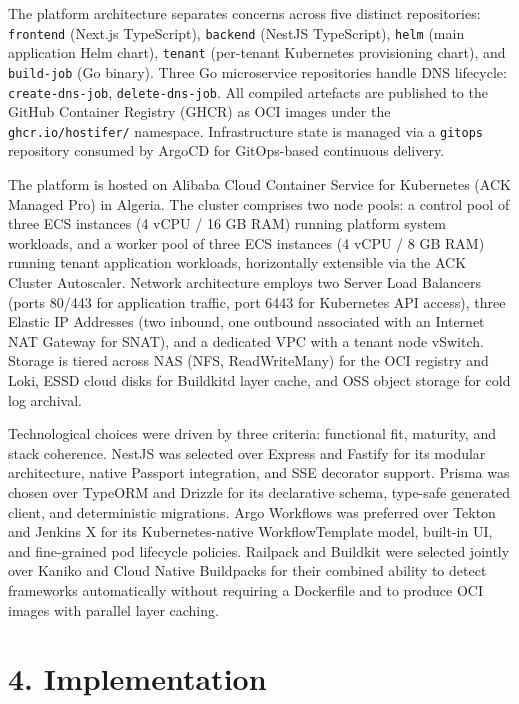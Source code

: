 The platform architecture separates concerns across five distinct repositories: \texttt{frontend} (Next.js TypeScript), \texttt{backend} (NestJS TypeScript), \texttt{helm} (main application Helm chart), \texttt{tenant} (per-tenant Kubernetes provisioning chart), and \texttt{build-job} (Go binary). Three Go microservice repositories handle DNS lifecycle: \texttt{create-dns-job}, \texttt{delete-dns-job}. All compiled artefacts are published to the GitHub Container Registry (GHCR) as OCI images under the \texttt{ghcr.io/hostifer/} namespace. Infrastructure state is managed via a \texttt{gitops} repository consumed by ArgoCD for GitOps-based continuous delivery.

The platform is hosted on Alibaba Cloud Container Service for Kubernetes (ACK Managed Pro) in Algeria. The cluster comprises two node pools: a control pool of three ECS instances (4 vCPU / 16 GB RAM) running platform system workloads, and a worker pool of three ECS instances (4 vCPU / 8 GB RAM) running tenant application workloads, horizontally extensible via the ACK Cluster Autoscaler. Network architecture employs two Server Load Balancers (ports 80/443 for application traffic, port 6443 for Kubernetes API access), three Elastic IP Addresses (two inbound, one outbound associated with an Internet NAT Gateway for SNAT), and a dedicated VPC with a tenant node vSwitch. Storage is tiered across NAS (NFS, ReadWriteMany) for the OCI registry and Loki, ESSD cloud disks for Buildkitd layer cache, and OSS object storage for cold log archival.

Technological choices were driven by three criteria: functional fit, maturity, and stack coherence. NestJS was selected over Express and Fastify for its modular architecture, native Passport integration, and SSE decorator support. Prisma was chosen over TypeORM and Drizzle for its declarative schema, type-safe generated client, and deterministic migrations. Argo Workflows was preferred over Tekton and Jenkins X for its Kubernetes-native WorkflowTemplate model, built-in UI, and fine-grained pod lifecycle policies. Railpack and Buildkit were selected jointly over Kaniko and Cloud Native Buildpacks for their combined ability to detect frameworks automatically without requiring a Dockerfile and to produce OCI images with parallel layer caching.

\section*{4. Implementation}

